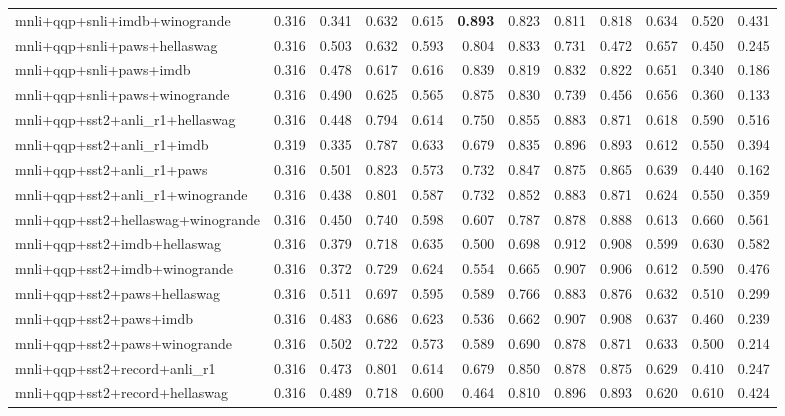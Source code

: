 \begin{table}[t]
\begin{tabular}{lrrrrrrrrrrr}
    mnli+qqp+snli+imdb+winogrande & 0.316 & 0.341 & 0.632 & 0.615 & \textbf{0.893} & 0.823 & 0.811 & 0.818 & 0.634 & 0.520 & 0.431 \\
    mnli+qqp+snli+paws+hellaswag & 0.316 & 0.503 & 0.632 & 0.593 & 0.804 & 0.833 & 0.731 & 0.472 & 0.657 & 0.450 & 0.245 \\
    mnli+qqp+snli+paws+imdb & 0.316 & 0.478 & 0.617 & 0.616 & 0.839 & 0.819 & 0.832 & 0.822 & 0.651 & 0.340 & 0.186 \\
    mnli+qqp+snli+paws+winogrande & 0.316 & 0.490 & 0.625 & 0.565 & 0.875 & 0.830 & 0.739 & 0.456 & 0.656 & 0.360 & 0.133 \\
    mnli+qqp+sst2+anli\_r1+hellaswag & 0.316 & 0.448 & 0.794 & 0.614 & 0.750 & 0.855 & 0.883 & 0.871 & 0.618 & 0.590 & 0.516 \\
    mnli+qqp+sst2+anli\_r1+imdb & 0.319 & 0.335 & 0.787 & 0.633 & 0.679 & 0.835 & 0.896 & 0.893 & 0.612 & 0.550 & 0.394 \\
    mnli+qqp+sst2+anli\_r1+paws & 0.316 & 0.501 & 0.823 & 0.573 & 0.732 & 0.847 & 0.875 & 0.865 & 0.639 & 0.440 & 0.162 \\
    mnli+qqp+sst2+anli\_r1+winogrande & 0.316 & 0.438 & 0.801 & 0.587 & 0.732 & 0.852 & 0.883 & 0.871 & 0.624 & 0.550 & 0.359 \\
    mnli+qqp+sst2+hellaswag+winogrande & 0.316 & 0.450 & 0.740 & 0.598 & 0.607 & 0.787 & 0.878 & 0.888 & 0.613 & 0.660 & 0.561 \\
    mnli+qqp+sst2+imdb+hellaswag & 0.316 & 0.379 & 0.718 & 0.635 & 0.500 & 0.698 & 0.912 & 0.908 & 0.599 & 0.630 & 0.582 \\
    mnli+qqp+sst2+imdb+winogrande & 0.316 & 0.372 & 0.729 & 0.624 & 0.554 & 0.665 & 0.907 & 0.906 & 0.612 & 0.590 & 0.476 \\
    mnli+qqp+sst2+paws+hellaswag & 0.316 & 0.511 & 0.697 & 0.595 & 0.589 & 0.766 & 0.883 & 0.876 & 0.632 & 0.510 & 0.299 \\
    mnli+qqp+sst2+paws+imdb & 0.316 & 0.483 & 0.686 & 0.623 & 0.536 & 0.662 & 0.907 & 0.908 & 0.637 & 0.460 & 0.239 \\
    mnli+qqp+sst2+paws+winogrande & 0.316 & 0.502 & 0.722 & 0.573 & 0.589 & 0.690 & 0.878 & 0.871 & 0.633 & 0.500 & 0.214 \\
    mnli+qqp+sst2+record+anli\_r1 & 0.316 & 0.473 & 0.801 & 0.614 & 0.679 & 0.850 & 0.878 & 0.875 & 0.629 & 0.410 & 0.247 \\
    mnli+qqp+sst2+record+hellaswag & 0.316 & 0.489 & 0.718 & 0.600 & 0.464 & 0.810 & 0.896 & 0.893 & 0.620 & 0.610 & 0.424 \\

\end{tabular}
\end{table}
